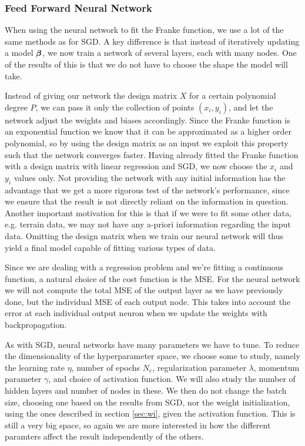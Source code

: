\documentclass[12pt]{extarticle}
\begin{document}
\subsubsection{Feed Forward Neural Network}
When using the neural network to fit the Franke function, we use a lot of the same methods as for SGD. A key difference is that instead of iteratively updating a model $\boldsymbol{\beta}$, we now train a network of several layers, each with many nodes. One of the results of this is that we do not have to choose the shape the model will take.

Instead of giving our network the design matrix $X$ for a certain polynomial degree $P$, we can pass it only the collection of points $(x_i, y_i)$, and let the network adjust the weights and biases accordingly. Since the Franke function is an exponential function we know that it can be approximated as a higher order polynomial, so by using the design matrix as an input we exploit this property such that the network converges faster. Having already fitted the Franke function with a design matrix with linear regression and SGD, we now choose the $x_i$ and $y_i$ values only. Not providing the network with any initial information has the advantage that we get a more rigorous test of the network's performance, since we ensure that the result is not directly reliant on the information in question. Another important motivation for this is that if we were to fit some other data, e.g. terrain data, we may not have any a-priori information regarding the input data. Omitting the design matrix when we train our neural network will thus yield a final model capable of fitting various types of data.

Since we are dealing with a regression problem and we're fitting a continuous function, a natural choice of the cost function is the MSE. For the neural network we will not compute the total MSE of the output layer as we have previously done, but the individual MSE of each output node. This takes into account the error at each individual output neuron when we update the weights with backpropagation.

As with SGD, neural networks have many parameters we have to tune. To reduce the dimensionality of the hyperparameter space, we choose some to study, namely the learning rate $\eta$, number of epochs $N_e$, regularization parameter $\lambda$, momentum parameter $\gamma$, and choice of activation function. We will also study the number of hidden layers and number of nodes in these. We then do not change the batch size, choosing one based on the results from SGD, nor the weight initialization, using the ones described in section \ref{sec:wi}, given the activation function. This is still a very big space, so again we are more interested in how the different paramters affect the result independently of the others.
\end{document}
